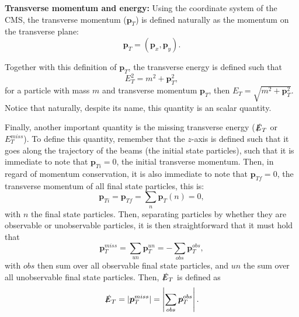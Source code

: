 \textbf{Transverse momentum and energy:} Using the coordinate system of the CMS, the transverse momentum ($\bm{p}_T$) is defined naturally as the momentum on the transverse plane:
\begin{equation*}
    \bm{p}_T = (\bm{p}_x, \bm{p}_y).
\end{equation*}

Together with this definition of $\bm{p}_T$, the transverse energy is defined such that
\begin{equation*}
    E_T^2 = m^2 + \bm{p}_T^2,
\end{equation*}
for a particle with mass $m$ and transverse momentum $\bm{p}_T$, then $E_T = \sqrt{m^2 + \bm{p}_T^2}$. Notice that naturally, despite its name, this quantity is an scalar quantity.

Finally, another important quantity is the missing transverse energy ($\slashed{E}_T$ or $E_T^{miss}$). To define this quantity, remember that the $z$-axis is defined such that it goes along the trajectory of the beams (the initial state particles), such that it is immediate to note that $\bm{p}_{Ti} = 0$, the initial transverse momentum. Then, in regard of momentum conservation, it is also immediate to note that $\bm{p}_{Tf} = 0$, the transverse momentum of all final state particles, this is:
\begin{equation*}
    \bm{p}_{Ti} = \bm{p}_{Tf} = \sum_n \bm{p}_T(n) = 0,
\end{equation*}
with $n$ the final state particles. Then, separating particles by whether they are observable or unobservable particles, it is then straightforward that it must hold that
\begin{equation}
\label{eqmissPT}
    \bm{p}_T^{miss} = \sum_{un} \bm{p}_T^{un} = -\sum_{obs} \bm{p}_{T}^{obs},
\end{equation}
with $obs$ then sum over all observable final state particles, and $un$ the sum over all unobservable final state particles. Then, $\slashed{E}_T$ is defined as
\begin{equation}
\label{eqmissET}
    \slashed{E}_T = |\bm{p}_T^{miss}| = \left| \sum_{obs} \bm{p}_{T}^{obs} \right|.
\end{equation}

